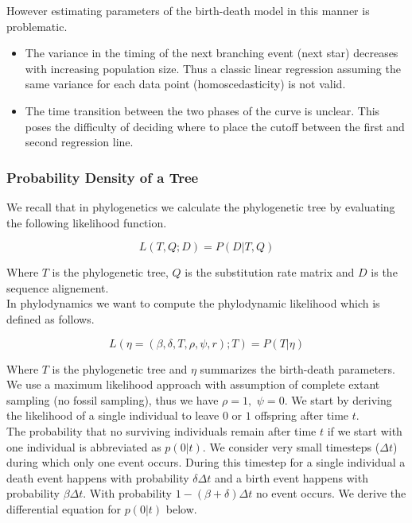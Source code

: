 \documentclass{article}
\begin{document}
\begin{multicols*}{3}
However estimating parameters of the birth-death model in this manner is problematic.
\begin{itemize}
    \item The variance in the timing of the next branching event (next star) decreases with increasing population size. Thus a classic linear regression assuming the same variance for each data point (homoscedasticity) is not valid. 
    \item The time transition between the two phases of the curve is unclear. This poses the difficulty of deciding where to place the cutoff between the first and second regression line. 
\end{itemize}

\subsubsection{Probability Density of a Tree}

We recall that in phylogenetics we calculate the phylogenetic tree by evaluating the following likelihood function. 

$$L(T,Q;D) = P(D|T,Q)$$

Where $T$ is the phylogenetic tree, $Q$ is the substitution rate matrix and $D$ is the sequence alignement.\\

In phylodynamics we want to compute the phylodynamic likelihood which is defined as follows. 

$$L(\eta = (\beta, \delta, T, \rho, \psi, r); T) = P(T|\eta)$$

Where $T$ is the phylogenetic tree and $\eta$ summarizes the birth-death parameters.\\

We use a maximum likelihood approach with assumption of complete extant sampling (no fossil sampling), thus we have $\rho = 1,$ $\psi = 0$. We start by deriving the likelihood of a single individual to leave $0$ or $1$ offspring after time $t$.\\

The probability that no surviving individuals remain after time $t$ if we start with one individual is abbreviated as $p(0|t)$. We consider very small timesteps ($\Delta t$) during which only one event occurs. During this timestep for a single individual a death event happens with probability $\delta \Delta t$ and a birth event happens with probability $\beta \Delta t$. With probability $1-(\beta + \delta)\Delta t$ no event occurs. We derive the differential equation for $p(0|t)$ below. 


\end{multicols*}
\end{document}
